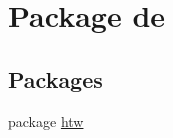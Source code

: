 \hypertarget{namespacede}{\section{Package de}
\label{namespacede}
}
\subsection*{Packages}
\begin{DoxyCompactItemize}
\item 
package \hyperlink{namespacede_1_1htw}{htw}
\end{DoxyCompactItemize}
